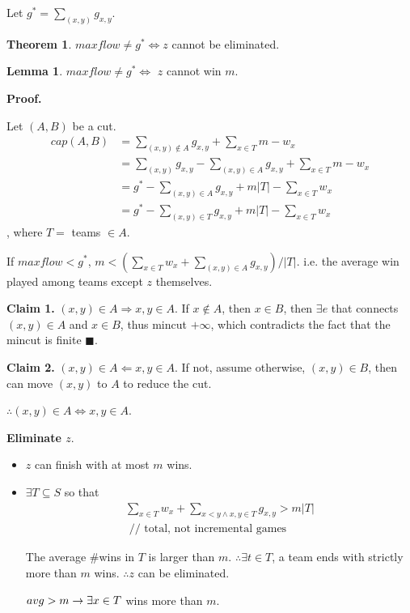 \documentclass[a4paper]{report}
\theoremstyle{definition}
\newtheorem{thm}{Theorem}[section]
\newtheorem{lem}{Lemma}[section]
\begin{document}
Let $g^*=\sum_{(x,y)} g_{x, y}$.

\begin{thm}
$maxflow \neq g^* \Leftrightarrow z$ cannot be eliminated. 
\end{thm}
\begin{lem}
$maxflow \neq g^* \Leftrightarrow$ $z$ cannot win $m$.
\end{lem}

\textbf{Proof.}

Let $(A, B)$ be a cut.
\begin{align*}
cap(A, B) &= \sum_{(x,y)\notin A} g_{x,y}+\sum_{x\in T} m-w_x\\
&= \sum_{(x,y)}g_{x, y}-\sum_{(x, y)\in A} g_{x, y}+\sum_{x\in T}m-w_x\\
&= g^*-\sum_{(x, y)\in A} g_{x, y}+m|T|-\sum_{x\in T}w_x\\
&= g^*-\sum_{(x, y)\in T} g_{x, y}+m|T|-\sum_{x\in T}w_x
\end{align*}
, where $T=$ teams $\in A$.

If $maxflow <g^*$, $m<(\sum_{x\in T} w_x+\sum_{(x,y)\in A} g_{x,y})/|T|$. i.e. the average win played among teams except $z$ themselves.

\textbf{Claim 1.} $(x,y)\in A \Rightarrow x,y \in A$. If $x \notin A$, then $x \in B$, then $\exists e$ that connects $(x,y)\in A$ and $x\in B$, thus mincut $+\infty$, which contradicts the fact that the mincut is finite $\blacksquare$.

\textbf{Claim 2.} $(x,y)\in A \Leftarrow x,y \in A$. If not, assume otherwise, $(x,y)\in B$, then can move $(x, y)$ to $A$ to reduce the cut. 

$\therefore (x,y)\in A \Leftrightarrow x,y \in A$. 

\textbf{Eliminate $z$}.
\begin{itemize}
\item $z$ can finish with at most $m$ wins.
\item $\exists T\subseteq S$ so that
\begin{align*}
\sum_{x\in T} w_x + \sum_{x<y \wedge x, y \in T} g_{x, y} > m|T|  \\
\text{ // total, not incremental games}
\end{align*}


The average \#wins in $T$ is larger than $m$. $\therefore \exists t \in T$, a team ends with strictly more than $m$ wins. $\therefore z$  can be eliminated.

$avg > m \rightarrow \exists x\in T$ wins more than $m$. 
\end{itemize}
\end{document}
